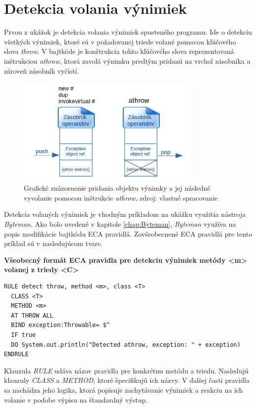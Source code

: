 \documentclass[11pt,final,oneside]{fithesis}
\newenvironment{example}[1]
{
\vspace{3mm}
\noindent\textbf{#1}
\vspace{2mm}
}
{
\vspace{3mm}
}
\begin{document}
\section{Detekcia volania výnimiek}
Prvou z ukážok je detekcia volania výnimiek spusteného programu. Ide o detekciu
všetkých výnimiek, ktoré sú v požadovanej triede volané pomocou kľúčového slova
\textit{throw}. V bajtkóde je konštrukcia tohto kľúčového slova reprezentovaná 
inštrukciou \textit{athrow}, ktorá zavolá výnimku predtým pridanú na vrchol 
zásobníka a zároveň zásobník vyčistí.

\begin{figure}[H]
  \centering
   \includegraphics[width=0.80\textwidth]{throw.png}
  \caption{Grafické znázornenie pridania objektu výnimky a jej následné 
  vyvolanie pomocou inštrukcie \textit{athrow}, zdroj: vlastné spracovanie}
  \label{fig:throw}
\end{figure}

Detekcia volaných výnimiek je vhodným príkladom na ukážku využitia nástroja 
\textit{Byteman}. Ako bolo uvedené v kapitole \ref{chap:Byteman}, 
\textit{Byteman} využíva na popis modifikácie bajtkódu ECA pravidlá. 
Zovšeobecnené ECA pravidlá pre tento príklad sú v nasledujúcom tvare.

\begin{example}{Všeobecný formát ECA pravidla pre detekciu výnimiek metódy <m> 
volanej z triedy <C>}
\begin{verbatim}
RULE detect throw, method <m>, class <T>
  CLASS <T>
  METHOD <m>
  AT THROW ALL
  BIND exception:Throwable= $^
  IF true
  DO System.out.println("Detected athrow, exception: " + exception)
ENDRULE
\end{verbatim}
\end{example}

Klauzula \textit{RULE} udáva názov pravidla pre konkrétnu metódu a triedu. 
Nasledujú klauzuly \textit{CLASS} a \textit{METHOD}, ktoré špecifikujú ich 
názvy. V ďalšej časti pravidla sa nachádza jeho logika, ktorá popisuje 
zachytávanie výnimiek a reakciu na ich volanie v podobe výpisu na štandardný 
výstup.
\end{document}
